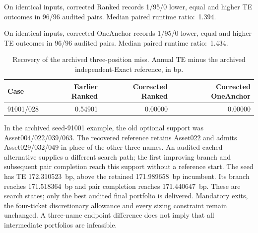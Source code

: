On identical inputs, corrected Ranked records 1/95/0 lower, equal and higher TE outcomes in 96/96 audited pairs. Median paired runtime ratio:~1.394.

On identical inputs, corrected OneAnchor records 1/95/0 lower, equal and higher TE outcomes in 96/96 audited pairs. Median paired runtime ratio:~1.434.

\begin{table}[htbp]\centering\small

\caption{Recovery of the archived three-position miss. Annual TE minus the archived independent-Exact reference, in bp.}

\begin{tabular}{lrrr}\toprule

Case & Earlier Ranked & Corrected Ranked & Corrected OneAnchor\\\midrule

91001/028 & 0.54901 & 0.00000 & 0.00000\\

\bottomrule\end{tabular}\end{table}

In the archived seed-91001 example, the old optional support was Asset004/022/039/063. The recovered reference retains Asset022 and admits Asset029/032/049 in place of the other three names. An audited cached alternative supplies a different search path; the first improving branch and subsequent pair completion reach this support without a reference start. The seed has TE 172.310523~bp, above the retained 171.989658~bp incumbent. Its branch reaches 171.518364~bp and pair completion reaches 171.440647~bp. These are search states; only the best audited final portfolio is delivered. Mandatory exits, the four-ticket discretionary allowance and every sizing constraint remain unchanged. A three-name endpoint difference does not imply that all intermediate portfolios are infeasible.

